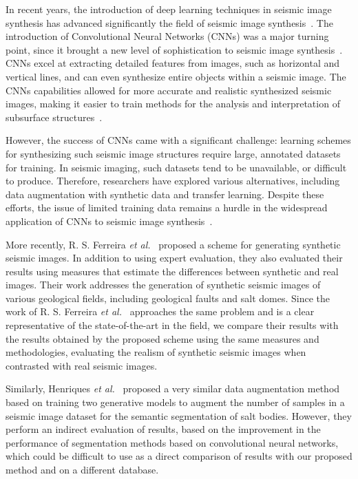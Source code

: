 ﻿\documentclass{ieeeaccess}
\begin{document}
In recent years, the introduction of deep learning techniques in seismic image synthesis has advanced significantly  the field of seismic image synthesis~\cite{Zeng2019}. The introduction of Convolutional Neural Networks (CNNs) was a major turning point, since it brought a new level of sophistication to seismic image synthesis~\cite{Powers2011}. CNNs excel at extracting detailed features from images, such as horizontal and vertical lines, and can even synthesize entire objects within a seismic image. The CNNs capabilities allowed for more accurate and realistic synthesized seismic images,  making it easier to train methods for the analysis and interpretation of subsurface structures~\cite{Powers2011}. 

However, the success of CNNs came with a significant challenge: learning schemes for synthesizing such seismic image structures require large, annotated datasets for training. In seismic imaging, such datasets tend to be unavailable, or difficult to produce. Therefore, researchers have explored various alternatives, including data augmentation with synthetic data and transfer learning. Despite these efforts, the issue of limited training data remains a hurdle in the widespread application of CNNs to seismic image synthesis~\cite{Wang2021}.

More recently, R. S. Ferreira \emph{et al.}~\cite{Ferreira2020} proposed a scheme for generating synthetic seismic images. In addition to using expert evaluation, they also evaluated their results using measures that estimate the differences between synthetic and real images. Their work addresses the generation of synthetic seismic images of various geological fields, including geological faults and salt domes. Since the work of R. S. Ferreira \emph{et al.}~\cite{Ferreira2020} approaches the same problem and is a clear representative of the state-of-the-art in the field, we compare their results with the results obtained by the proposed scheme using the same measures and methodologies, evaluating the realism of synthetic seismic images when contrasted with real seismic images.

Similarly, Henriques \emph{et al.}~\cite{Henriques2021} proposed a very similar data augmentation method based on training two generative models to augment the number of samples in a seismic image dataset for the semantic segmentation of salt bodies. However, they perform an indirect evaluation of results, based on the improvement in the performance of segmentation methods based on convolutional neural networks, which could be difficult to use as a direct comparison of results with our proposed method and on a different database.
\end{document}
